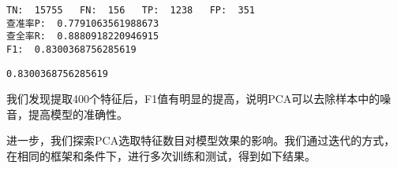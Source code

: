 \documentclass[11pt]{article}
\makeatletter
\newcommand{\boxspacing}{\kern\kvtcb@left@rule\kern\kvtcb@boxsep}
\newcommand{\prompt}[4]{
        \ttfamily\llap{{\color{#2}[#3]:\hspace{3pt}#4}}\vspace{-\baselineskip}
    }
\makeatother
\begin{document}
    \begin{Verbatim}[commandchars=\\\{\}]
TN:  15755   FN:  156   TP:  1238   FP:  351
查准率P:  0.7791063561988673
查全率R:  0.8880918220946915
F1:  0.8300368756285619
    \end{Verbatim}

            \begin{tcolorbox}[breakable, size=fbox, boxrule=.5pt, pad at break*=1mm, opacityfill=0]
\prompt{Out}{outcolor}{41}{\boxspacing}
\begin{Verbatim}[commandchars=\\\{\}]
0.8300368756285619
\end{Verbatim}
\end{tcolorbox}
        
    我们发现提取400个特征后，F1值有明显的提高，说明PCA可以去除样本中的噪音，提高模型的准确性。

进一步，我们探索PCA选取特征数目对模型效果的影响。我们通过迭代的方式，在相同的框架和条件下，进行多次训练和测试，得到如下结果。
\end{document}
